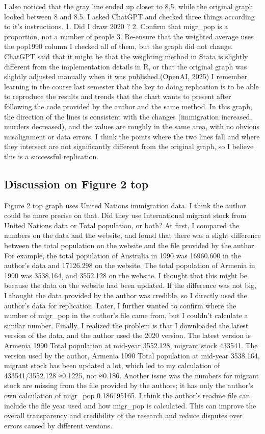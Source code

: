 \documentclass[
  man,
  floatsintext,
  longtable,
  nolmodern,
  notxfonts,
  notimes,
  colorlinks=true,linkcolor=blue,citecolor=blue,urlcolor=blue]{apa7}
\begin{document}
I also noticed that the gray line ended up closer to 8.5, while the
original graph looked between 8 and 8.5. I asked ChatGPT and checked
three things according to it's instructions. 1. Did I draw 2020 ? 2.
Confirm that migr\_pop is a proportion, not a number of people 3.
Re-ensure that the weighted average uses the pop1990 column I checked
all of them, but the graph did not change. ChatGPT said that it might be
that the weighting method in Stata is slightly different from the
implementation details in R, or that the original graph was slightly
adjusted manually when it was published.(OpenAI, 2025) I remember
learning in the course last semester that the key to doing replication
is to be able to reproduce the results and trends that the chart wants
to present after following the code provided by the author and the same
method. In this graph, the direction of the lines is consistent with the
changes (immigration increased, murders decreased), and the values are
roughly in the same area, with no obvious misalignment or data errors. I
think the points where the two lines fall and where they intersect are
not significantly different from the original graph, so I believe this
is a successful replication.

\subsection{Discussion on Figure 2
top}\label{discussion-on-figure-2-top}

Figure 2 top graph uses United Nations immigration data. I think the
author could be more precise on that. Did they use International migrant
stock from United Nations data or Total population, or both? At first, I
compared the numbers on the data and the website, and found that there
was a slight difference between the total population on the website and
the file provided by the author. For example, the total population of
Australia in 1990 was 16960.600 in the author's data and 17126.298 on
the website. The total population of Armenia in 1990 was 3538.164, and
3552.128 on the website. I thought that this might be because the data
on the website had been updated. If the difference was not big, I
thought the data provided by the author was credible, so I directly used
the author's data for replication. Later, I further wanted to confirm
where the number of migr\_pop in the author's file came from, but I
couldn't calculate a similar number. Finally, I realized the problem is
that I downloaded the latest version of the data, and the author used
the 2020 version. The latest version is Armenia 1990 Total population at
mid-year 3552.128, migrant stock 433541. The version used by the author,
Armenia 1990 Total population at mid-year 3538.164, migrant stock has
been updated a lot, which led to my calculation of 433541/3552.128
≈0.1225, not ≈0.186. Another issue was the numbers for migrant stock are
missing from the file provided by the authors; it has only the author's
own calculation of migr\_pop 0.186195165. I think the author's readme
file can include the file year used and how migr\_pop is calculated.
This can improve the overall transparency and credibility of the
research and reduce disputes over errors caused by different versions.
\end{document}
